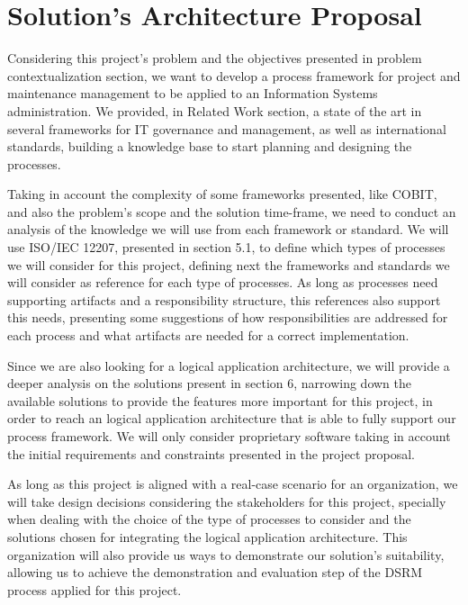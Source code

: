 
% 
% 

\section{Solution's Architecture Proposal}

Considering this project's problem and the objectives presented in problem contextualization section, we want to develop a process framework for project and maintenance management to be applied to an Information Systems administration. We provided, in Related Work section, a state of the art in several frameworks for IT governance and management, as well as international standards, building a knowledge base to start planning and designing the processes.\par
Taking in account the complexity of some frameworks presented, like COBIT, and also the problem's scope and the solution time-frame, we need to conduct an analysis of the knowledge we will use from each framework or standard. We will use ISO/IEC 12207, presented in section 5.1, to define which types of processes we will consider for this project, defining next the frameworks and standards we will consider as reference for each type of processes. As long as processes need supporting artifacts and a responsibility structure, this references also support this needs, presenting some suggestions of how responsibilities are addressed for each process and what artifacts are needed for a correct implementation.\par
Since we are also looking for a logical application architecture, we will provide a deeper analysis on the solutions present in section 6, narrowing down the available solutions to provide the features more important for this project, in order to reach an logical application architecture that is able to fully support our process framework. We will only consider proprietary software taking in account the initial requirements and constraints presented in the project proposal.\par
As long as this project is aligned with a real-case scenario for an organization, we will take design decisions considering the stakeholders for this project, specially when dealing with the choice of the type of processes to consider and the solutions chosen for integrating the logical application architecture. This organization will also provide us ways to demonstrate our solution's suitability, allowing us to achieve the demonstration and evaluation step of the DSRM process applied for this project.\par




